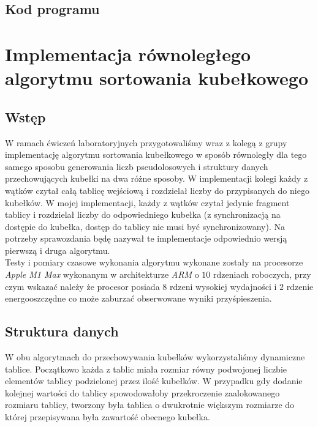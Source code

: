 \documentclass{article}
\begin{document}
        \subsection{Kod programu}
        
        
        
        
    \newpage 
    \section{Implementacja równoległego algorytmu sortowania kubełkowego}
    \subsection{Wstęp}
    W ramach ćwiczeń laboratoryjnych przygotowaliśmy wraz z kolegą z grupy implementację algorytmu sortowania kubełkowego w sposób równoległy dla tego samego sposobu generowania liczb pseudolosowych i struktury danych przechowujących kubełki na dwa różne sposoby. W implementacji kolegi każdy z wątków czytał całą tablicę wejściową i rozdzielał liczby do przypisanych do niego kubełków. W mojej implementacji, każdy z wątków czytał jedynie fragment tablicy i rozdzielał liczby do odpowiedniego kubełka (z synchronizacją na dostępie do kubełka, dostęp do tablicy nie musi być synchronizowany). Na potrzeby sprawozdania będę nazywał te implementacje odpowiednio wersją pierwszą i druga algorytmu. \\
    
    Testy i pomiary czasowe wykonania algorytmu wykonane zostały na procesorze \textit{Apple M1 Max} wykonanym w architekturze \textit{ARM} o $10$ rdzeniach roboczych, przy czym wskazać należy że procesor posiada $8$ rdzeni wysokiej wydajności i $2$ rdzenie energooszczędne co może zaburzać obserwowane wyniki przyśpieszenia.  
        
    \subsection{Struktura danych}
    W obu algorytmach do przechowywania kubełków wykorzystaliśmy dynamiczne tablice. Początkowo każda z tablic miała rozmiar równy podwojonej liczbie elementów tablicy podzielonej przez ilość kubełków. W przypadku gdy dodanie kolejnej wartości do tablicy spowodowałoby przekroczenie zaalokowanego rozmiaru tablicy, tworzony była tablica o dwukrotnie większym rozmiarze do której przepisywana była zawartość obecnego kubełka. \\
    
\end{document}
